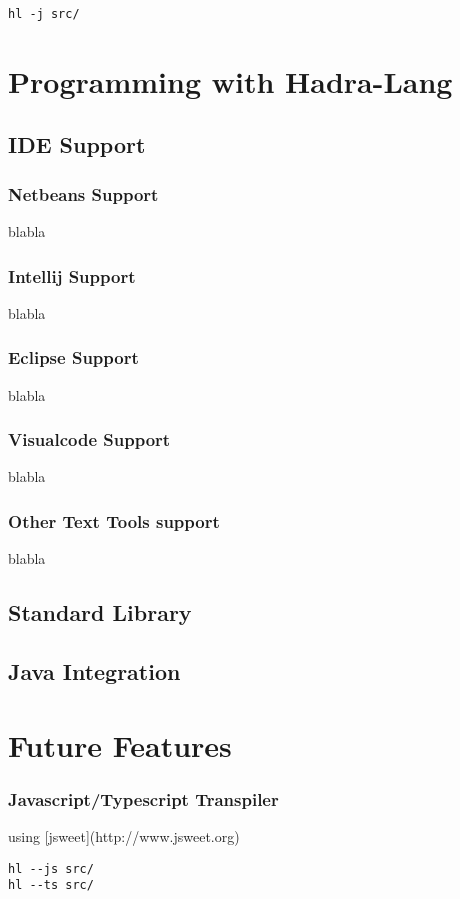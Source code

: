 \documentclass{tufte-book}
\begin{document}
            \begin{lstlisting}
hl -j src/
            \end{lstlisting}

    \part{Programming with Hadra-Lang}
        \chapter{IDE Support}
        \section{Netbeans Support}
        blabla
        \section{Intellij Support}
        blabla
        \section{Eclipse Support}
        blabla
        
        \section{Visualcode Support}
        blabla
        \section{Other Text Tools support}
        blabla
        \chapter{Standard Library}
        \chapter{Java Integration}

    \part{Future Features}
        \section{Javascript/Typescript Transpiler}
        using [jsweet](http://www.jsweet.org)
        \begin{lstlisting}
hl --js src/
hl --ts src/
        \end{lstlisting}
\end{document}
